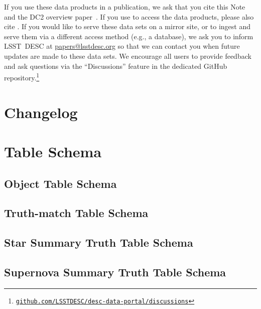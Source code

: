 \documentclass[modern]{descnote}
\newcommand*{\https}[1]{\href{https://#1}{\nolinkurl{#1}}}
\begin{document}
If you use these data products in a publication, we ask that you cite this Note and the DC2 overview paper~\citep{2020arXiv201005926L}.
If you use  to access the data products, please also cite \cite{2018ApJS..234...36M}. 
If you would like to serve these data sets on a mirror site, or to ingest and serve them via a different access method (e.g., a database), we ask you to inform LSST~DESC at \href{mailto:papers@lsstdesc.org}{papers@lsstdesc.org} so that we can contact you when future updates are made to these data sets.
We encourage all users to provide feedback and ask questions via the ``Discussions'' feature in the dedicated GitHub repository.\footnote{\https{github.com/LSSTDESC/desc-data-portal/discussions}}

\clearpage
\appendix
\section{Changelog}


\clearpage

\section{Table Schema}

\subsection{Object Table Schema}
\label{app:object-schema}


\bigskip

\subsection{Truth-match Table Schema}
\label{app:truth-schema}


\bigskip

\subsection{Star Summary Truth Table Schema}
\label{app:star-summary-truth-schema}


\bigskip

\subsection{Supernova Summary Truth Table Schema}
\label{app:sn-summary-truth-schema}

\end{document}
